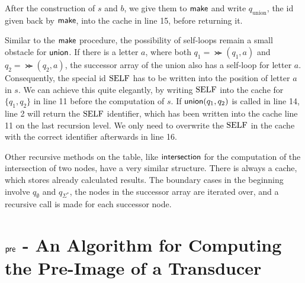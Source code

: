 \par 

After the construction of $s$ and $b$, we give them to $\operatorname{\textsf{make}}$ and write $q_{\text{union}}$, the id given back by $\operatorname{\textsf{make}}$, into the cache in line 15, before returning it.

\par

Similar to the $\operatorname{\textsf{make}}$ procedure, the possibility of self-loops remain a small obstacle for $\operatorname{\textsf{union}}$. If there is a letter $a$, where both $q_{1} = \Succ(q_{1},a)$ and $q_{2} = \Succ(q_{2},a)$, the successor array of the union also has a self-loop for letter $a$. Consequently, the special id $\mathrm{SELF}$ has to be written into the position of letter $a$ in $s$. We can achieve this quite elegantly, by writing $\mathrm{SELF}$ into the cache for $\{q_{1},q_{2}\}$ in line 11 before the computation of $s$. If $\operatorname{\textsf{union}}(q_{1},q_{2})$ is called in line 14, line 2 will return the $\mathrm{SELF}$ identifier, which has been written into the cache line 11 on the last recursion level. We only need to overwrite the $\mathrm{SELF}$ in the cache with the correct identifier afterwards in line 16.
\par
Other recursive methods on the table, like $\operatorname{\textsf{intersection}}$ for the computation of the intersection of two nodes, have a very similar structure. There is always a cache, which stores already calculated results. The boundary cases in the beginning involve $q_{\emptyset}$ and $q_{\Sigma^{*}}$, the nodes in the successor array are iterated over, and a recursive call is made for each successor node. 


\section{$\operatorname{\textsf{pre}}$ - An Algorithm for Computing the Pre-Image of a Transducer}


